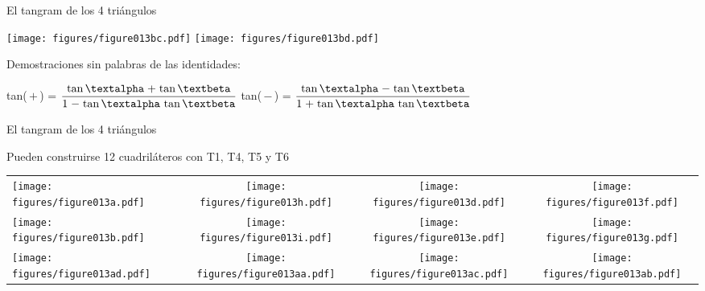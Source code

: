 \documentclass[14pt,aspectratio=169,usenames,dvipsnames]{beamer}
\begin{document}

    \begin{frame}{El tangram de los 4 triángulos}
        \begin{center}
            \texttt{[image: figures/figure013bc.pdf]}\qquad
            \texttt{[image: figures/figure013bd.pdf]}

            \bigskip
            Demostraciones sin palabras de las identidades:
            \bigskip

            {\footnotesize tan(\textalpha\,$+$\,\textbeta) = $\displaystyle\frac{\text{tan\,\textalpha\;$+$\;tan\,\textbeta}}{\text{1\;$-$\;tan\,\textalpha\,\,tan\,\textbeta}}$\qquad
            tan(\textalpha\,$-$\,\textbeta) = $\displaystyle\frac{\text{tan\,\textalpha\;$-$\;tan\,\textbeta}}{\text{1\;$+$\;tan\,\textalpha\,\,tan\,\textbeta}}$\\[5ex]}
        \end{center}
    \end{frame}


    \begin{frame}{El tangram de los 4 triángulos}
        \begin{center}
            Pueden construirse 12 cuadriláteros con T1, T4, T5 y T6

            \bigskip\bigskip

            \begin{tabular}{lccc}
                \texttt{[image: figures/figure013a.pdf]} &
                \texttt{[image: figures/figure013h.pdf]} &
                \texttt{[image: figures/figure013d.pdf]} &
                \texttt{[image: figures/figure013f.pdf]} \\[2ex]
                \texttt{[image: figures/figure013b.pdf]} &
                \texttt{[image: figures/figure013i.pdf]} &
                \texttt{[image: figures/figure013e.pdf]} &
                \texttt{[image: figures/figure013g.pdf]} \\[2ex]
                \!\!\texttt{[image: figures/figure013ad.pdf]} \;\; &
                \texttt{[image: figures/figure013aa.pdf]}\!\!  &
                \!\!\!\!\!\texttt{[image: figures/figure013ac.pdf]}  &
                \texttt{[image: figures/figure013ab.pdf]} \\
            \end{tabular}

            \bigskip\bigskip
        \end{center}
    \end{frame}
\end{document}
